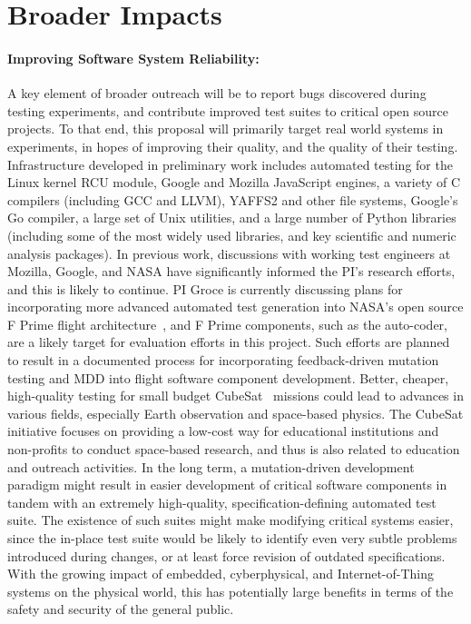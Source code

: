\section{Broader Impacts}

\paragraph{Improving Software System Reliability:} A key element of
broader outreach will be to report bugs discovered during testing
experiments, and contribute improved test suites to critical open
source projects.  To that end, this proposal will primarily target real world
systems in experiments, in hopes of improving their quality, and
the quality of their testing.  Infrastructure developed in preliminary
work includes automated testing for
the Linux kernel RCU module, Google and Mozilla JavaScript engines, a
variety of C compilers (including GCC and LLVM), YAFFS2 \cite{yaffs2}
and other file systems, Google's Go compiler, a large set of Unix
utilities, and a large number of Python libraries (including some of
the most widely used libraries, and key scientific and numeric
analysis packages).  In previous work, discussions with working test
engineers at Mozilla, Google, and NASA have significantly informed the PI's
research efforts, and this is likely to continue.  PI Groce is
currently discussing plans for incorporating more advanced automated
test generation into NASA's open source F Prime flight
architecture~\cite{fprime,fprimerepo}, 
and F Prime components, such as the auto-coder, are a likely target
for evaluation efforts in this project.  Such efforts are planned to
result in a documented process for incorporating feedback-driven
mutation testing and MDD into flight software component development.
Better, cheaper, high-quality testing for small budget CubeSat~\cite{CubeSat}
missions could lead to advances in various fields, especially Earth
observation and space-based physics.  The CubeSat initiative focuses on providing a
low-cost way for educational institutions and non-profits to conduct space-based
research, and thus is also related to education and outreach
activities.
In the long term,
a mutation-driven development paradigm might result in
easier development of critical software components in tandem with an
extremely high-quality, specification-defining automated test suite.
The existence of such suites might make modifying critical systems
easier, since the in-place test suite would be likely to identify even
very subtle problems introduced during changes, or at least force
revision of outdated specifications.  With the growing
impact of embedded, cyberphysical, and Internet-of-Thing systems on
the physical world, this has potentially large benefits in terms of the safety and security
of the general public.

